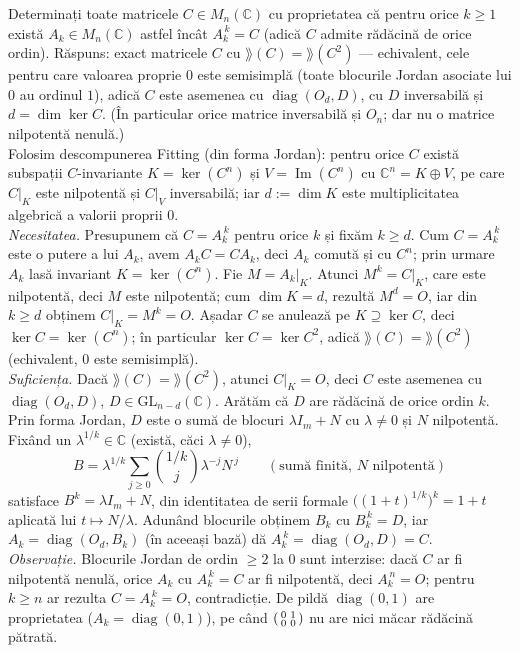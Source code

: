Determinați toate matricele $C\in M_n(\mathbb{C})$ cu proprietatea că pentru orice $k\ge1$ există $A_k\in M_n(\mathbb{C})$ astfel încât $A_k^{\,k}=C$ (adică $C$ admite rădăcină de orice ordin).
\sol Răspuns: exact matricele $C$ cu $\rang(C)=\rang(C^2)$ --- echivalent, cele pentru care valoarea proprie $0$ este semisimplă (toate blocurile Jordan asociate lui $0$ au ordinul $1$), adică $C$ este asemenea cu $\operatorname{diag}(O_d,D)$, cu $D$ inversabilă și $d=\dim\ker C$. (În particular orice matrice inversabilă și $O_n$; dar nu o matrice nilpotentă nenulă.)\\[2pt]
Folosim descompunerea Fitting (din forma Jordan): pentru orice $C$ există subspații $C$-invariante $K=\ker(C^n)$ și $V=\operatorname{Im}(C^n)$ cu $\mathbb{C}^n=K\oplus V$, pe care $C|_K$ este nilpotentă și $C|_V$ inversabilă; iar $d:=\dim K$ este multiplicitatea algebrică a valorii proprii $0$.\\[2pt]
\emph{Necesitatea.} Presupunem că $C=A_k^{\,k}$ pentru orice $k$ și fixăm $k\ge d$. Cum $C=A_k^{\,k}$ este o putere a lui $A_k$, avem $A_kC=CA_k$, deci $A_k$ comută și cu $C^n$; prin urmare $A_k$ lasă invariant $K=\ker(C^n)$. Fie $M=A_k|_K$. Atunci $M^k=C|_K$, care este nilpotentă, deci $M$ este nilpotentă; cum $\dim K=d$, rezultă $M^d=O$, iar din $k\ge d$ obținem $C|_K=M^k=O$. Așadar $C$ se anulează pe $K\supseteq\ker C$, deci $\ker C=\ker(C^n)$; în particular $\ker C=\ker C^2$, adică $\rang(C)=\rang(C^2)$ (echivalent, $0$ este semisimplă).\\[2pt]
\emph{Suficiența.} Dacă $\rang(C)=\rang(C^2)$, atunci $C|_K=O$, deci $C$ este asemenea cu $\operatorname{diag}(O_d,D)$, $D\in\mathrm{GL}_{n-d}(\mathbb{C})$. Arătăm că $D$ are rădăcină de orice ordin $k$. Prin forma Jordan, $D$ este o sumă de blocuri $\lambda I_m+N$ cu $\lambda\neq0$ și $N$ nilpotentă. Fixând un $\lambda^{1/k}\in\mathbb{C}$ (există, căci $\lambda\neq0$),
\[ B=\lambda^{1/k}\sum_{j\ge0}\binom{1/k}{j}\lambda^{-j}N^{\,j}\qquad(\text{sumă finită, }N\text{ nilpotentă}) \]
satisface $B^k=\lambda I_m+N$, din identitatea de serii formale $\bigl((1+t)^{1/k}\bigr)^{k}=1+t$ aplicată lui $t\mapsto N/\lambda$. Adunând blocurile obținem $B_k$ cu $B_k^{\,k}=D$, iar $A_k=\operatorname{diag}(O_d,B_k)$ (în aceeași bază) dă $A_k^{\,k}=\operatorname{diag}(O_d,D)=C$.\\[2pt]
\emph{Observație.} Blocurile Jordan de ordin $\ge2$ la $0$ sunt interzise: dacă $C$ ar fi nilpotentă nenulă, orice $A_k$ cu $A_k^{\,k}=C$ ar fi nilpotentă, deci $A_k^{\,n}=O$; pentru $k\ge n$ ar rezulta $C=A_k^{\,k}=O$, contradicție. De pildă $\operatorname{diag}(0,1)$ are proprietatea ($A_k=\operatorname{diag}(0,1)$), pe când $\begin{psmallmatrix}0&1\\0&0\end{psmallmatrix}$ nu are nici măcar rădăcină pătrată.\\[2pt]
